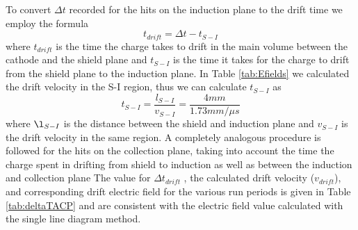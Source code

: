 To convert $\Delta t$ recorded for the hits on the induction plane to the drift time we employ the formula
\begin{equation}
t_{drift} = \Delta t - t_{S-I}
\end{equation}
where $t_{drift}$ is the time the charge takes to drift in the main volume between the cathode and the shield plane and $t_{S-I}$ is the time it takes for the charge to drift from the shield plane to the induction plane. In Table \ref{tab:Efields} we calculated the drift velocity in the S-I region, thus we can calculate $t_{S-I}$ as 
\begin{equation}
t_{S-I} = \frac{l_{S-I}}{v_{S-I}} = \frac{4 mm}{1.73 mm/ \mu s}
\end{equation}
where $\l_{S-I}$ is the distance between the shield and induction plane and $v_{S-I}$ is the drift velocity in the same region. A completely analogous procedure is followed for the hits on the collection plane, taking into account the time the charge spent in drifting from shield to induction as well as between the induction and collection plane
The value for $\Delta t_{drift}$ , the calculated drift velocity ($v_{drift}$), and corresponding drift electric field for the various run periods is given in Table \ref{tab:deltaTACP} and are consistent with the electric field value calculated with the single line diagram method.

